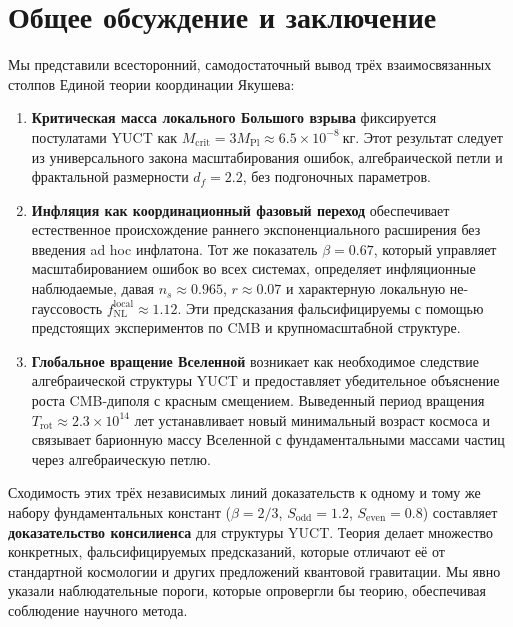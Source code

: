 \documentclass[11pt,a4paper]{article}
\begin{document}
	
	\part{Общее обсуждение и заключение}
	\label{part:conclusion}
	
	Мы представили всесторонний, самодостаточный вывод трёх взаимосвязанных столпов Единой теории координации Якушева:
	
	\begin{enumerate}
		\item \textbf{Критическая масса локального Большого взрыва} фиксируется постулатами YUCT как \(M_{\mathrm{crit}} = 3 M_{\mathrm{Pl}} \approx 6.5 \times 10^{-8}\ \text{кг}\). Этот результат следует из универсального закона масштабирования ошибок, алгебраической петли и фрактальной размерности \(d_f = 2.2\), без подгоночных параметров.
		
		\item \textbf{Инфляция как координационный фазовый переход} обеспечивает естественное происхождение раннего экспоненциального расширения без введения ad hoc инфлатона. Тот же показатель \(\beta = 0.67\), который управляет масштабированием ошибок во всех системах, определяет инфляционные наблюдаемые, давая \(n_s \approx 0.965\), \(r \approx 0.07\) и характерную локальную не-гауссовость \(f_{\mathrm{NL}}^{\mathrm{local}} \approx 1.12\). Эти предсказания фальсифицируемы с помощью предстоящих экспериментов по CMB и крупномасштабной структуре.
		
		\item \textbf{Глобальное вращение Вселенной} возникает как необходимое следствие алгебраической структуры YUCT и предоставляет убедительное объяснение роста CMB-диполя с красным смещением. Выведенный период вращения \(T_{\mathrm{rot}} \approx 2.3 \times 10^{14}\) лет устанавливает новый минимальный возраст космоса и связывает барионную массу Вселенной с фундаментальными массами частиц через алгебраическую петлю.
	\end{enumerate}
	
	Сходимость этих трёх независимых линий доказательств к одному и тому же набору фундаментальных констант (\(\beta = 2/3\), \(S_{\mathrm{odd}}=1.2\), \(S_{\mathrm{even}}=0.8\)) составляет \textbf{доказательство консилиенса} для структуры YUCT. Теория делает множество конкретных, фальсифицируемых предсказаний, которые отличают её от стандартной космологии и других предложений квантовой гравитации. Мы явно указали наблюдательные пороги, которые опровергли бы теорию, обеспечивая соблюдение научного метода.
	
\end{document}
